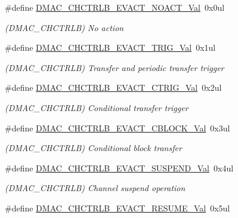 \begin{DoxyCompactItemize}
\item 
\#define \mbox{\hyperlink{group___s_a_m_d21___d_m_a_c_ga0a82857cf374c8eb7754e671c886dcac}{D\+M\+A\+C\+\_\+\+C\+H\+C\+T\+R\+L\+B\+\_\+\+E\+V\+A\+C\+T\+\_\+\+N\+O\+A\+C\+T\+\_\+\+Val}}~0x0ul
\begin{DoxyCompactList}\small\item\em (D\+M\+A\+C\+\_\+\+C\+H\+C\+T\+R\+LB) No action \end{DoxyCompactList}\item 
\#define \mbox{\hyperlink{group___s_a_m_d21___d_m_a_c_ga069ed2b2546fdd8706fe1eedcb1674d2}{D\+M\+A\+C\+\_\+\+C\+H\+C\+T\+R\+L\+B\+\_\+\+E\+V\+A\+C\+T\+\_\+\+T\+R\+I\+G\+\_\+\+Val}}~0x1ul
\begin{DoxyCompactList}\small\item\em (D\+M\+A\+C\+\_\+\+C\+H\+C\+T\+R\+LB) Transfer and periodic transfer trigger \end{DoxyCompactList}\item 
\#define \mbox{\hyperlink{group___s_a_m_d21___d_m_a_c_ga4cf090f0ab1ac7d1231fb79627925227}{D\+M\+A\+C\+\_\+\+C\+H\+C\+T\+R\+L\+B\+\_\+\+E\+V\+A\+C\+T\+\_\+\+C\+T\+R\+I\+G\+\_\+\+Val}}~0x2ul
\begin{DoxyCompactList}\small\item\em (D\+M\+A\+C\+\_\+\+C\+H\+C\+T\+R\+LB) Conditional transfer trigger \end{DoxyCompactList}\item 
\#define \mbox{\hyperlink{group___s_a_m_d21___d_m_a_c_ga87b04d4f4a880d5fab6638ae0281a535}{D\+M\+A\+C\+\_\+\+C\+H\+C\+T\+R\+L\+B\+\_\+\+E\+V\+A\+C\+T\+\_\+\+C\+B\+L\+O\+C\+K\+\_\+\+Val}}~0x3ul
\begin{DoxyCompactList}\small\item\em (D\+M\+A\+C\+\_\+\+C\+H\+C\+T\+R\+LB) Conditional block transfer \end{DoxyCompactList}\item 
\#define \mbox{\hyperlink{group___s_a_m_d21___d_m_a_c_gacb1322d1f22aee0ec2daecb1c51dbbc4}{D\+M\+A\+C\+\_\+\+C\+H\+C\+T\+R\+L\+B\+\_\+\+E\+V\+A\+C\+T\+\_\+\+S\+U\+S\+P\+E\+N\+D\+\_\+\+Val}}~0x4ul
\begin{DoxyCompactList}\small\item\em (D\+M\+A\+C\+\_\+\+C\+H\+C\+T\+R\+LB) Channel suspend operation \end{DoxyCompactList}\item 
\#define \mbox{\hyperlink{group___s_a_m_d21___d_m_a_c_ga7356b082779dc3467dd5003f8ed8c01b}{D\+M\+A\+C\+\_\+\+C\+H\+C\+T\+R\+L\+B\+\_\+\+E\+V\+A\+C\+T\+\_\+\+R\+E\+S\+U\+M\+E\+\_\+\+Val}}~0x5ul

\end{DoxyCompactItemize}
